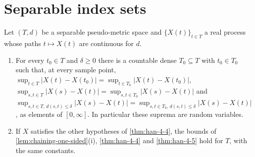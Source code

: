 \section{Separable index sets}

\begin{lemma}
  \label{lem:chaining-transfer}
  Let $(T,d)$ be a separable pseudo-metric space and $\{X(t)\}_{t\in T}$ a real process whose paths $t\mapsto X(t)$ are continuous for $d$.
  \begin{enumerate}
    \item[(i)] For every $t_0\in T$ and $\delta\ge0$ there is a countable dense $T_0\subseteq T$ with $t_0\in T_0$ such that, at every sample point,
    $\sup_{t\in T}|X(t)-X(t_0)|=\sup_{t\in T_0}|X(t)-X(t_0)|$,
    $\sup_{s,t\in T}|X(s)-X(t)|=\sup_{s,t\in T_0}|X(s)-X(t)|$ and
    $\sup_{s,t\in T,\,d(s,t)\le\delta}|X(s)-X(t)|=\sup_{s,t\in T_0,\,d(s,t)\le\delta}|X(s)-X(t)|$, as elements of $[0,\infty]$. In particular these suprema are random variables.
    \item[(ii)] If $X$ satisfies the other hypotheses of \cref{thm:han-4-4}, the bounds of \cref{lem:chaining-one-sided}(i), \cref{thm:han-4-4} and \cref{thm:han-4-5} hold for $T$, with the same constants.
  \end{enumerate}
\end{lemma}
